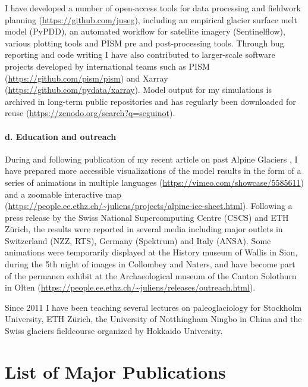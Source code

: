 \documentclass{article}
\begin{document}
    I have developed a number of open-access tools for data processing and
    fieldwork planning (\url{https://github.com/juseg}), including an empirical
    glacier surface melt model (PyPDD), an automated workflow for satellite
    imagery (Sentinelflow), various plotting tools and PISM pre and
    post-processing tools. Through bug reporting and code writing I have also
    contributed to larger-scale software projects developed by international
    teams such as PISM (\url{https://github.com/pism/pism}) and Xarray
    (\url{https://github.com/pydata/xarray}). Model output for my simulations is
    archived in long-term public repositories and has regularly been downloaded
    for reuse (\url{https://zenodo.org/search?q=seguinot}).

\paragraph{d. Education and outreach}

    During and following publication of my recent article on past Alpine
    Glaciers \citep{Seguinot.etal.2018}, I have prepared more accessible
    visualizations of the model results in the form of a series of animations
    in multiple languages (\url{https://vimeo.com/showcase/5585611}) and a
    zoomable interactive map
    (\url{https://people.ee.ethz.ch/~juliens/projects/alpine-ice-sheet.html}).
    Following a press release by the Swiss National Supercomputing Centre
    (CSCS) and ETH Zürich, the results were reported in several media including
    major outlets in Switzerland (NZZ, RTS), Germany (Spektrum) and Italy
    (ANSA). Some animations were temporarily displayed at the History museum of
    Wallis in Sion, during the 5th night of images in Collombey and Naters, and
    have become part of the permanen exhibit at the Archaeological museum of
    the Canton Solothurn in Olten
    (\url{https://people.ee.ethz.ch/~juliens/releases/outreach.html}).

    Since 2011 I have been teaching several lectures on paleoglaciology for
    Stockholm University, ETH Zürich, the University of Notthingham Ningbo in
    China and the Swiss glaciers fieldcourse organized by Hokkaido University.


\section{List of Major Publications}
\end{document}
